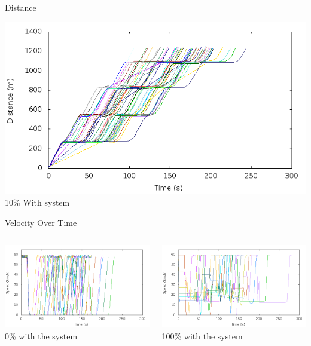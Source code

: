 \begin{frame}{Distance}

\includegraphics[width=1\textwidth]{images/tp0/distance10.png}\\
10\% With system
\end{frame}

\begin{frame}{Velocity Over Time}
\begin{columns}
	\begin{column}{0.5\textwidth}
	\includegraphics[width=1\textwidth]{images/tp0/speed0.png}\\
	0\% with the system
	\end{column}
	\begin{column}{0.5\textwidth}
	\includegraphics[width=1\textwidth]{images/tp0/speed100.png}\\
	100\% with the system
	\end{column}
\end{columns}
\end{frame}

